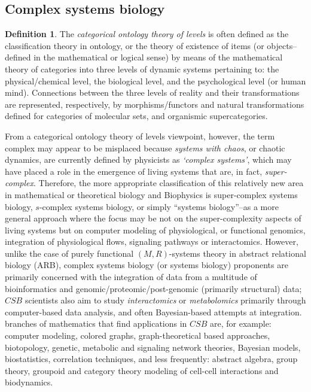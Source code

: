 \documentclass[12pt]{article}
\theoremstyle{plain}
\theoremstyle{definition}
\newtheorem{definition}{Definition}[section]
\numberwithin{equation}{section}
\begin{document}
\subsection{Complex systems biology} 
\begin{definition}
 The \emph{categorical ontology theory of levels} is often defined as the classification theory in ontology, or the theory of existence of items (or objects--defined in the mathematical or logical sense) by means of the mathematical theory of categories into three levels of dynamic systems pertaining to: the physical/chemical level, the biological level, and the psychological level (or human mind). Connections between the three levels of reality and their transformations are represented, respectively, by morphisms/functors and natural transformations defined for categories of molecular sets, 
 and organismic supercategories.
\end{definition}

 From a categorical ontology theory of levels viewpoint, however, the term complex may appear to be misplaced because {\em systems with chaos}, or chaotic dynamics, are currently defined by physicists as {\em `complex systems'}, which may have placed a role in the emergence of living systems that are, in fact, {\em super-complex}. Therefore, the more appropriate classification of this relatively new area in mathematical or theoretical biology and Biophysics is 
super-complex systems biology, $s$-complex systems biology, or simply ``systems biology''--as a more general approach where the focus may be not on the super-complexity aspects of living systems but on computer modeling of physiological, or functional genomics, integration of physiological flows, signaling pathways or interactomics.  However, unlike the case of purely functional $(M,R)$-systems theory in abstract relational biology (ARB), complex systems biology (or systems biology) proponents are primarily concerned with the integration of data from a multitude of bioinformatics and genomic/proteomic/post-genomic (primarily structural) data; $CSB$ scientists also aim to study {\em interactomics} or {\em metabolomics} primarily through computer-based data analysis, and often Bayesian-based attempts at integration.  branches of mathematics that find applications in $CSB$ are, for example: computer modeling, colored graphs, graph-theoretical based approaches, biotopology, genetic, metabolic and signaling network theories, Bayesian models, biostatistics, correlation techniques, and less frequently: abstract algebra, group theory, groupoid and category theory modeling of cell-cell interactions and biodynamics.

\end{document}
